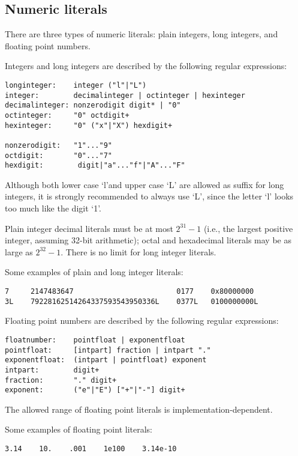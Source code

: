 \subsection{Numeric literals}

There are three types of numeric literals: plain integers, long
integers, and floating point numbers.

Integers and long integers are described by the following regular expressions:

\begin{verbatim}
longinteger:    integer ("l"|"L")
integer:        decimalinteger | octinteger | hexinteger
decimalinteger: nonzerodigit digit* | "0"
octinteger:     "0" octdigit+
hexinteger:     "0" ("x"|"X") hexdigit+

nonzerodigit:   "1"..."9"
octdigit:       "0"..."7"
hexdigit:        digit|"a"..."f"|"A"..."F"
\end{verbatim}

Although both lower case `l'and upper case `L' are allowed as suffix
for long integers, it is strongly recommended to always use `L', since
the letter `l' looks too much like the digit `1'.

Plain integer decimal literals must be at most $2^{31} - 1$ (i.e., the
largest positive integer, assuming 32-bit arithmetic); octal and
hexadecimal literals may be as large as $2^{32} - 1$.  There is no limit
for long integer literals.

Some examples of plain and long integer literals:

\begin{verbatim}
7     2147483647                        0177    0x80000000
3L    79228162514264337593543950336L    0377L   0100000000L
\end{verbatim}

Floating point numbers are described by the following regular expressions:

\begin{verbatim}
floatnumber:    pointfloat | exponentfloat
pointfloat:     [intpart] fraction | intpart "."
exponentfloat:  (intpart | pointfloat) exponent
intpart:        digit+
fraction:       "." digit+
exponent:       ("e"|"E") ["+"|"-"] digit+
\end{verbatim}

The allowed range of floating point literals is
implementation-dependent.

Some examples of floating point literals:

\begin{verbatim}
3.14    10.    .001    1e100    3.14e-10
\end{verbatim}

